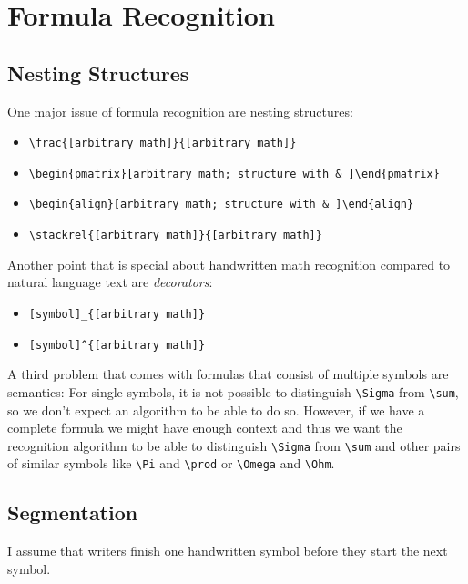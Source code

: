 \chapter{Formula Recognition}\label{ch:FormulaRecognition}
\section{Nesting Structures}
One major issue of formula recognition are nesting structures:

\begin{itemize}
    \item \verb+\frac{[arbitrary math]}{[arbitrary math]}+
    \item \verb+\begin{pmatrix}[arbitrary math; structure with & ]\end{pmatrix}+
    \item \verb+\begin{align}[arbitrary math; structure with & ]\end{align}+
    \item \verb+\stackrel{[arbitrary math]}{[arbitrary math]}+
\end{itemize}

Another point that is special about handwritten math recognition compared to
natural language text are \textit{decorators}:

\begin{itemize}
    \item \verb+[symbol]_{[arbitrary math]}+
    \item \verb+[symbol]^{[arbitrary math]}+
\end{itemize}

A third problem that comes with formulas that consist of multiple symbols are
semantics: For single symbols, it is not possible to distinguish \verb+\Sigma+
from \verb+\sum+, so we don't expect an algorithm to be able to do so.
However, if we have a complete formula we might have enough context and thus
we want the recognition algorithm to be able to distinguish \verb+\Sigma+
from \verb+\sum+ and other pairs of similar symbols like \verb+\Pi+ and
\verb+\prod+ or \verb+\Omega+ and \verb+\Ohm+.

\section{Segmentation}
I assume that writers finish one handwritten symbol before they start the next
symbol.

